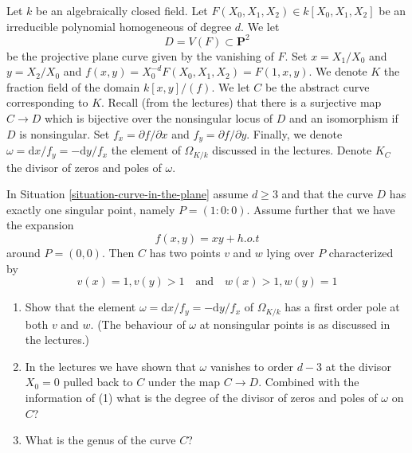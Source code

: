 \begin{situation}
\label{situation-curve-in-the-plane}
Let $k$ be an algebraically closed field. Let
$F(X_0, X_1, X_2) \in k[X_0, X_1, X_2]$ be an irreducible polynomial
homogeneous of degree $d$. We let
$$
D = V(F) \subset \mathbf{P}^2
$$
be the projective plane curve given by the vanishing of $F$.
Set $x = X_1/X_0$ and $y = X_2/X_0$ and
$f(x, y) = X_0^{-d}F(X_0, X_1, X_2) = F(1, x, y)$.
We denote $K$ the fraction field of the domain $k[x, y]/(f)$.
We let $C$ be the abstract curve corresponding to $K$.
Recall (from the lectures) that there is a surjective map $C \to D$
which is bijective over the nonsingular locus of $D$ and an
isomorphism if $D$ is nonsingular.
Set $f_x = \partial f/\partial x$ and $f_y = \partial f/\partial y$.
Finally, we denote $\omega = \text{d}x/f_y = - \text{d}y/f_x$ the
element of $\Omega_{K/k}$ discussed in the lectures.
Denote $K_C$ the divisor of zeros and poles of $\omega$.
\end{situation}

\begin{exercise}
\label{exercise-node-in-the-plane}
In Situation \ref{situation-curve-in-the-plane} assume
$d \geq 3$ and that the curve $D$ has exactly one singular point,
namely $P = (1 : 0 : 0)$. Assume further that we have the expansion
$$
f(x, y) = xy + h.o.t
$$
around $P = (0, 0)$. Then $C$ has two points $v$ and $w$ lying over
$P$ characterized by
$$
v(x) = 1, v(y) > 1
\quad\text{and}\quad
w(x) > 1, w(y) = 1
$$
\begin{enumerate}
\item Show that the element
$\omega = \text{d}x/f_y = - \text{d}y/f_x$ of $\Omega_{K/k}$
has a first order pole at both $v$ and $w$. (The behaviour of
$\omega$ at nonsingular points is as discussed in the lectures.)
\item In the lectures we have shown that $\omega$ vanishes to order
$d - 3$ at the divisor $X_0 = 0$ pulled back to $C$ under the map
$C \to D$. Combined with the information of (1) what is the degree
of the divisor of zeros and poles of $\omega$ on $C$?
\item What is the genus of the curve $C$?
\end{enumerate}
\end{exercise}

